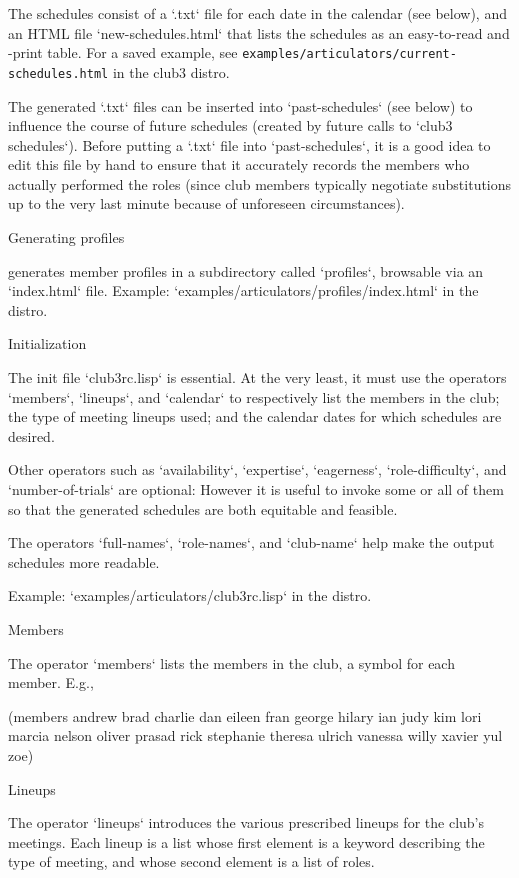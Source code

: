 The schedules consist of a `.txt` file for each date
in the calendar (see below), and an HTML file `new-schedules.html`
that lists the schedules as an easy-to-read and -print table.
For a saved example, see
{\tt examples/articulators/current-schedules.html} in the club3 distro.

The generated `.txt` files can be inserted into `past-schedules` (see
below) to influence the course of future schedules (created by future
calls to `club3 schedules`).  Before putting a `.txt` file into
`past-schedules`, it is a good idea to edit this file by hand to ensure
that it accurately records the members who actually performed the roles
(since club members typically negotiate substitutions up to the very
last minute because of unforeseen circumstances).

\beginsection Generating profiles

\begintt
\endtt
generates member profiles in a subdirectory called `profiles`, browsable
via an `index.html` file.
Example: `examples/articulators/profiles/index.html` in the distro.

\beginsection Initialization

The init file `club3rc.lisp` is essential.  At the very least, it must
use the operators `members`, `lineups`, and `calendar` to respectively list
the members in the club; the type of meeting lineups used; and the
calendar dates for which schedules are desired.

Other operators such as `availability`, `expertise`, `eagerness`,
`role-difficulty`, and `number-of-trials` are optional: However it is useful
to invoke some or all of them so that the generated schedules are both
equitable and feasible.

The operators `full-names`, `role-names`, and `club-name` help make the output
schedules more readable.

Example: `examples/articulators/club3rc.lisp` in the distro.

\beginsection Members

The operator `members` lists the members in the club, a symbol for each
member.  E.g.,

\begintt
(members andrew brad charlie dan eileen fran george hilary ian judy
         kim lori marcia nelson oliver prasad rick stephanie theresa
         ulrich vanessa willy xavier yul zoe)
\endtt

\beginsection Lineups

The operator `lineups` introduces the various prescribed lineups for the
club’s meetings.  Each lineup is a list whose first element is a keyword
describing the type of meeting, and whose second element is a list of
roles.

